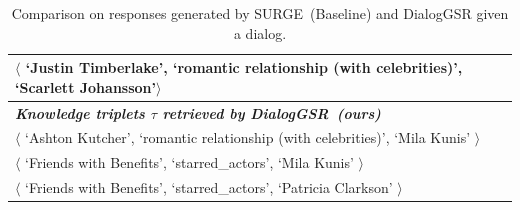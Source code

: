 \begin{table}[ht!]
{\begin{tabular}{llll}
        \multicolumn{4}{l}{$\langle$ `Justin Timberlake', `romantic relationship (with celebrities)', `Scarlett Johansson'$ \rangle$} \\
        \midrule
        \multicolumn{4}{l}{\textit{\textbf{Knowledge triplets $\tau$ retrieved by DialogGSR~(ours)}}}\\
        \multicolumn{4}{l}{$\langle$ `Ashton Kutcher', `romantic relationship (with celebrities)', `Mila Kunis' $\rangle$}\\
        \multicolumn{4}{l}{$\langle$ `Friends with Benefits', `starred\_actors', `Mila Kunis'  $\rangle$}\\
        \multicolumn{4}{l}{$\langle$ `Friends with Benefits', `starred\_actors', `Patricia Clarkson' $\rangle$}\\
\bottomrule
\end{tabular}
}
\vspace{-5pt}
\caption{Comparison on responses generated by SURGE~(Baseline) and DialogGSR given a dialog.}
\label{tab:qual}
\vspace{-13pt}
\end{table}